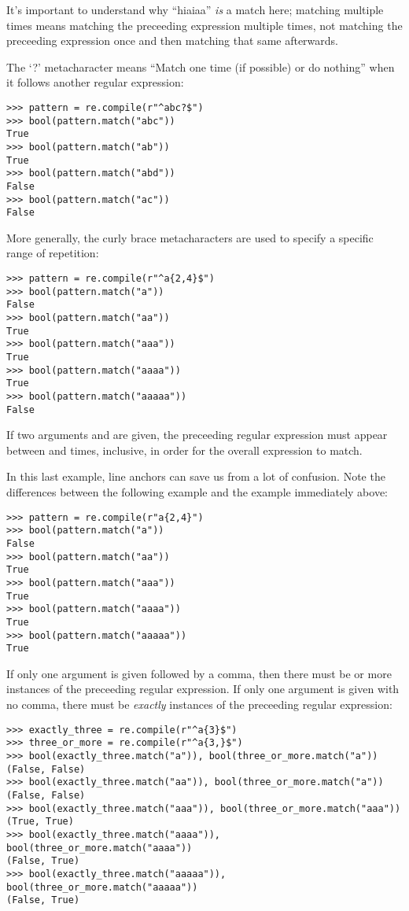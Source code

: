 It's important to understand why ``hiaiaa'' \emph{is} a match here; matching multiple times means matching the preceeding expression multiple times, not matching the preceeding expression once and then matching that same afterwards. %

The `?' metacharacter means ``Match one time (if possible) or do nothing'' when it follows another regular expression:
\begin{lstlisting}
>>> pattern = re.compile(r"^abc?$")
>>> bool(pattern.match("abc"))
True
>>> bool(pattern.match("ab"))
True
>>> bool(pattern.match("abd"))
False
>>> bool(pattern.match("ac"))
False
\end{lstlisting}

More generally, the curly brace metacharacters are used to specify a specific range of repetition:
\begin{lstlisting}
>>> pattern = re.compile(r"^a{2,4}$")
>>> bool(pattern.match("a"))
False
>>> bool(pattern.match("aa"))
True
>>> bool(pattern.match("aaa"))
True
>>> bool(pattern.match("aaaa"))
True
>>> bool(pattern.match("aaaaa"))
False
\end{lstlisting}

If two arguments  and  are given, the preceeding regular expression must appear between  and  times, inclusive, in order for the overall expression to match.

\begin{Warn}
In this last example, line anchors can save us from a lot of confusion. Note the differences between the following example and the example immediately above:
\begin{lstlisting}
>>> pattern = re.compile(r"a{2,4}")
>>> bool(pattern.match("a"))
False
>>> bool(pattern.match("aa"))
True
>>> bool(pattern.match("aaa"))
True
>>> bool(pattern.match("aaaa"))
True
>>> bool(pattern.match("aaaaa"))
True
\end{lstlisting}
\end{Warn}

If only one argument  is given followed by a comma, then there must be  or more instances of the preceeding regular expression. If only one argument  is given with no comma, there must be \emph{exactly}  instances of the preceeding regular expression:
\begin{lstlisting}
>>> exactly_three = re.compile(r"^a{3}$")
>>> three_or_more = re.compile(r"^a{3,}$")
>>> bool(exactly_three.match("a")), bool(three_or_more.match("a"))
(False, False)
>>> bool(exactly_three.match("aa")), bool(three_or_more.match("a"))
(False, False)
>>> bool(exactly_three.match("aaa")), bool(three_or_more.match("aaa"))
(True, True)
>>> bool(exactly_three.match("aaaa")), bool(three_or_more.match("aaaa"))
(False, True)
>>> bool(exactly_three.match("aaaaa")), bool(three_or_more.match("aaaaa"))
(False, True)
\end{lstlisting}



